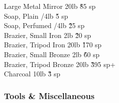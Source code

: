 \begin{multicols}{3}
{\begin{tabbing}
Large Metal Mirror			\> 20lb			\' \` 85 sp \\
Soap, Plain			/4lb			\' \` 5 sp \\
Soap, Perfumed			/4lb			\' \` 25 sp \\
Brazier, Small Iron			\> 2lb			\' \` 20 sp \\
Brazier, Tripod Iron			\> 20lb			\' \` 170 sp \\
Brazier, Small Bronze			\> 2lb			\' \` 60 sp \\
Brazier, Tripod Bronze			\> 20lb			\' \` 395 sp+ \\
Charcoal			\> 10lb			\' \` 3 sp \\
\end{tabbing}

\subsubsection{Tools \& Miscellaneous}

}
\end{multicols}
